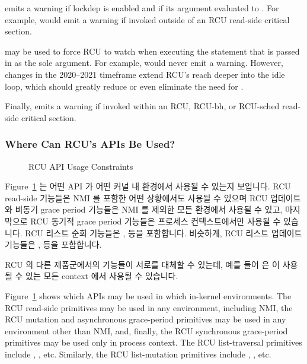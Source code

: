  emits a warning if lockdep is enabled and if
its argument evaluated to .
For example,  would emit a
warning if invoked outside of an RCU read-side critical section.

 may be used to force RCU to watch when executing
the statement that is passed in as the sole argument.
For example, 
would never emit a warning.
However, changes in the 2020--2021 timeframe extend RCU's reach deeper
into the idle loop, which should greatly reduce or even eliminate the
need for .

Finally,   emits a warning if invoked within
an RCU, RCU-bh, or RCU-sched read-side critical section.

\fi

\subsubsection{Where Can RCU's APIs Be Used?}
\label{sec:defer:Where Can RCU's APIs Be Used?}

\begin{figure}[tb]
\centering
{}
\caption{RCU API Usage Constraints}
\label{fig:defer:RCU API Usage Constraints}
\end{figure}

Figure~\ref{fig:defer:RCU API Usage Constraints}
는 어떤 API 가 어떤 커널 내 환경에서 사용될 수 있는지 보입니다.
RCU read-side 기능들은 NMI 를 포함한 어떤 상황에서도 사용될 수 있으며 RCU
업데이트와 비동기 grace period 기능들은 NMI 를 제외한 모든 환경에서 사용될 수
있고, 마지막으로 RCU 동기적 grace period 기능들은 프로세스 컨텍스트에서만
사용될 수 있습니다.
RCU 리스트 순회 기능들은
,  등을
포함합니다.
비슷하게, RCU 리스트 업데이트 기능들은 ,
 등을 포함합니다.

RCU 의 다른 제품군에서의 기능들이 서로를 대체할 수 있는데, 예를 들어
 은  이 사용될 수 있는 모든 context
에서 사용될 수 있습니다.

\iffalse

Figure~\ref{fig:defer:RCU API Usage Constraints}
shows which APIs may be used in which in-kernel environments.
The RCU read-side primitives may be used in any environment, including NMI,
the RCU mutation and asynchronous grace-period primitives may be used in any
environment other than NMI, and, finally, the RCU synchronous grace-period
primitives may be used only in process context.
The RCU list-traversal primitives include ,
, etc.
Similarly, the RCU list-mutation primitives include
, , etc.

